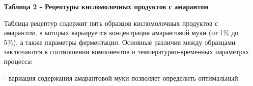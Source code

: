 {{\bfseries Таблица 2 - Рецептуры кисломолочных продуктов с амарантом}


Таблица рецептур содержит пять образцов кисломолочных продуктов с
амарантом, в которых варьируется концентрация амарантовой муки (от 1\%
до 5\%), а также параметры ферментации. Основные различия между
образцами заключаются в соотношении компонентов и температурно-временных
параметрах процесса:

- вариация содержания амарантовой муки позволяет определить оптимальный

}
